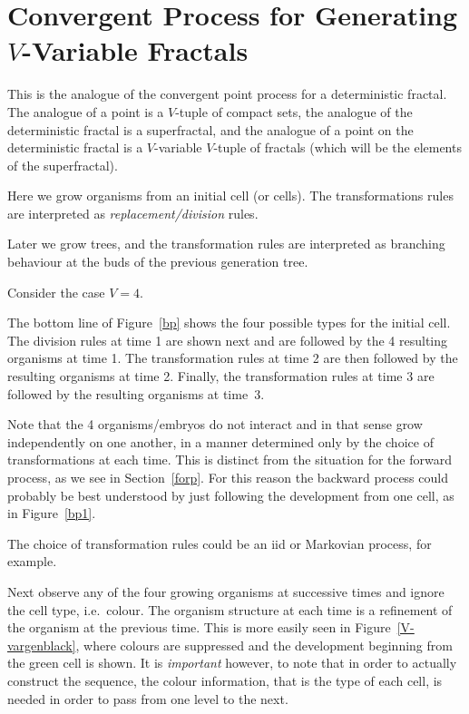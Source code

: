 \documentclass[11pt]{amsart}
\begin{document}
\section{Convergent Process for Generating $ V $-Variable Fractals} This is the analogue of the convergent point process for a deterministic fractal.   The analogue of a point is a $ V $-tuple of compact sets, the analogue of the deterministic fractal is a superfractal, and the analogue of a point on the deterministic fractal is a $ V $-variable $ V $-tuple of fractals (which will be the elements of the superfractal).
 
 
\medskip  Here we grow organisms from an initial cell (or cells). The transformations rules are interpreted as \emph{replacement/division}   rules. 

Later we grow trees, and the transformation rules are interpreted as branching behaviour at the buds of the previous generation tree.
   
\bigskip Consider the case $ V=4 $. 

The bottom line of Figure~\ref{bp} shows the four possible types for the initial cell.  The   division rules at time 1 are shown next and  are followed by the 4 resulting organisms at time 1.  The transformation rules at time 2 are then followed by the resulting organisms at time 2.  Finally, the transformation rules at time 3 are followed by the resulting organisms at time~3. 
   
   Note that the 4 organisms/embryos do not interact and in that sense grow  independently on one another, in a manner determined only by the choice of transformations at each time.   This is distinct from the situation for the forward process, as we see in Section~\ref{forp}.   For this reason the backward process could probably be  best understood by just following the development from one cell, as in Figure~\ref{bp1}. 
   
   
\medskip     The choice of transformation rules could be an iid or Markovian process, for example. 

\medskip Next observe any of the four  growing organisms at successive times and ignore the cell type, i.e.\ colour. 
 The organism structure at each time is a refinement  of the organism at the previous time.  This is more easily seen in Figure~\ref{V-vargenblack}, where colours are suppressed and the development beginning from the green cell is shown. It is \emph{important} however, to note that in order to actually construct the sequence, the colour information, that is the type of each cell, is needed in order to pass from one level to the next.
 
\end{document}
